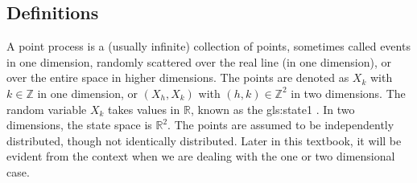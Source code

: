 \documentclass[10pt]{article}
\begin{document}
\subsection{Definitions}\label{s:def}

A \textcolor{index}{point process} is a (usually infinite) collection of points, sometimes called events in one dimension, randomly scattered over the real line (in one dimension), or over the entire space in higher dimensions. The points are denoted as $X_k$ with $k\in\mathbb{Z}$ in one dimension, or $(X_h,X_k)$ with $(h,k)\in \mathbb{Z}^2$ in two dimensions. The random variable $X_k$ takes values in $\mathbb{R}$, known as the
\gls{gls:state1}
.
In two dimensions, the state space is $\mathbb{R}^2$. The points are assumed to be independently distributed, though not identically distributed. Later in this textbook, it will be evident from the context when we are dealing with the one or two dimensional case.
\end{document}

